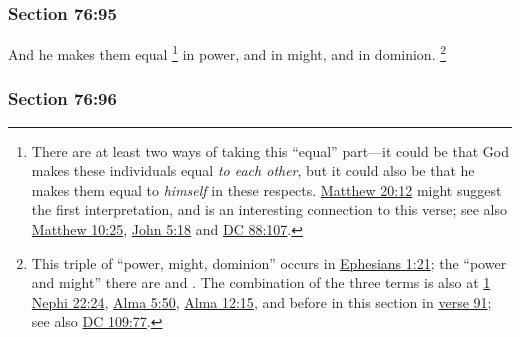 
	\subsubsection{Section 76:95} %
		\label{DC76-95}

		And he makes them equal%
			\footnote{%
				There are at least two ways of taking this ``equal'' part---it could be that God makes these individuals equal \textit{to each other}, but it could also be that he makes them equal to \textit{himself} in these respects. \hyperref[MATTHEW-20-12]{Matthew 20:12} might suggest the first interpretation, and is an interesting connection to this verse; see also \hyperref[MATTHEW-10-25]{Matthew 10:25}, \hyperref[JOHN-5-18]{John 5:18} and \hyperref[DC88-107]{DC 88:107}.
				}
		in power, and in might, and in dominion.%
			\footnote{%
				This triple of ``power, might, dominion'' occurs in \hyperref[EPHESIANS-1-21]{Ephesians 1:21}; the ``power and might'' there are  and . The combination of the three terms is also at \hyperref[1NEPHI-22-24]{1 Nephi 22:24}, \hyperref[ALMA-5-50]{Alma 5:50}, \hyperref[ALMA-12-15]{Alma 12:15}, and before in this section in \hyperref[DC76-91]{verse 91}; see also \hyperref[DC109-77]{DC 109:77}.
				}


	\subsubsection{Section 76:96} %
		\label{DC76-96}

